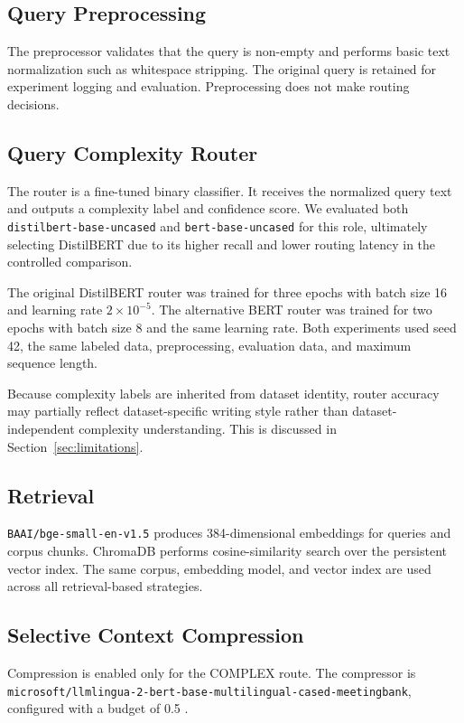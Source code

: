 \documentclass[conference]{IEEEtran}
\begin{document}
\subsection{Query Preprocessing}
The preprocessor validates that the query is non-empty and performs basic text normalization such as whitespace stripping. The original query is retained for experiment logging and evaluation. Preprocessing does not make routing decisions.

\subsection{Query Complexity Router}
The router is a fine-tuned binary classifier. It receives the normalized query text and outputs a complexity label and confidence score. We evaluated both \texttt{distilbert-base-uncased} and \texttt{bert-base-uncased} for this role, ultimately selecting DistilBERT due to its higher recall and lower routing latency in the controlled comparison.

The original DistilBERT router was trained for three epochs with batch size 16 and learning rate $2\times10^{-5}$. The alternative BERT router was trained for two epochs with batch size 8 and the same learning rate. Both experiments used seed 42, the same labeled data, preprocessing, evaluation data, and maximum sequence length.

Because complexity labels are inherited from dataset identity, router accuracy may partially reflect dataset-specific writing style rather than dataset-independent complexity understanding. This is discussed in Section~\ref{sec:limitations}.

\subsection{Retrieval}
\texttt{BAAI/bge-small-en-v1.5} produces 384-dimensional embeddings for queries and corpus chunks. ChromaDB performs cosine-similarity search over the persistent vector index. The same corpus, embedding model, and vector index are used across all retrieval-based strategies.

\subsection{Selective Context Compression}
Compression is enabled only for the COMPLEX route. The compressor is \texttt{microsoft/llmlingua-2-bert-base-multilingual-cased-meetingbank}, configured with a budget of 0.5 \cite{pan2024llmlingua2}.
\end{document}
